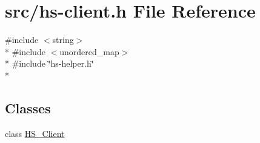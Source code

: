 \hypertarget{hs-client_8h}{}\section{src/hs-\/client.h File Reference}
\label{hs-client_8h}
{\ttfamily \#include $<$string$>$}\\*
{\ttfamily \#include $<$unordered\+\_\+map$>$}\\*
{\ttfamily \#include \char`\"{}hs-\/helper.\+h\char`\"{}}\\*
\subsection*{Classes}
\begin{DoxyCompactItemize}
\item 
class \hyperlink{class_h_s___client}{H\+S\+\_\+\+Client}
\end{DoxyCompactItemize}
